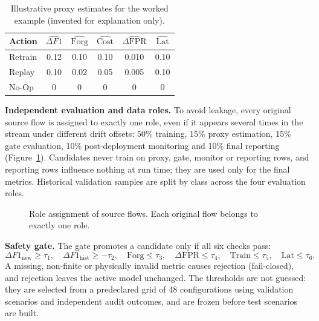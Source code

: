 \documentclass{article}
\begin{document}
\begin{table}[h]
\centering
\caption{Illustrative proxy estimates for the worked example (invented for explanation only).}
\label{tab:example}
\small
\begin{tabular}{lccccc}
\toprule
Action & $\widehat{\Delta F1}$ & $\widehat{\text{Forg}}$ & $\widehat{\text{Cost}}$ & $\widehat{\Delta\text{FPR}}$ & $\widehat{\text{Lat}}$ \\
\midrule
Retrain & 0.12 & 0.10 & 0.10 & 0.010 & 0.10 \\
Replay  & 0.10 & 0.02 & 0.05 & 0.005 & 0.10 \\
No-Op   & 0 & 0 & 0 & 0 & 0 \\
\bottomrule
\end{tabular}
\end{table}

\textbf{Independent evaluation and data roles.} To avoid leakage, every original source flow is assigned to exactly one role, even if it appears several times in the stream under different drift offsets: 50\% training, 15\% proxy estimation, 15\% gate evaluation, 10\% post-deployment monitoring and 10\% final reporting (Figure~\ref{fig:roles}). Candidates never train on proxy, gate, monitor or reporting rows, and reporting rows influence nothing at run time; they are used only for the final metrics. Historical validation samples are split by class across the four evaluation roles.

\begin{figure}[h]
\centering
{}
\caption{Role assignment of source flows. Each original flow belongs to exactly one role.}
\label{fig:roles}
\end{figure}

\textbf{Safety gate.} The gate promotes a candidate only if all six checks pass:
\begin{equation}
\Delta F1_{\text{new}}\ge\tau_1,\quad \Delta F1_{\text{hist}}\ge-\tau_2,\quad \text{Forg}\le\tau_3,\quad \Delta\text{FPR}\le\tau_4,\quad \text{Train}\le\tau_5,\quad \text{Lat}\le\tau_6 .
\label{eq:gate}
\end{equation}
A missing, non-finite or physically invalid metric causes rejection (fail-closed), and rejection leaves the active model unchanged. The thresholds are not guessed: they are selected from a predeclared grid of 48 configurations using validation scenarios and independent audit outcomes, and are frozen before test scenarios are built.
\end{document}
